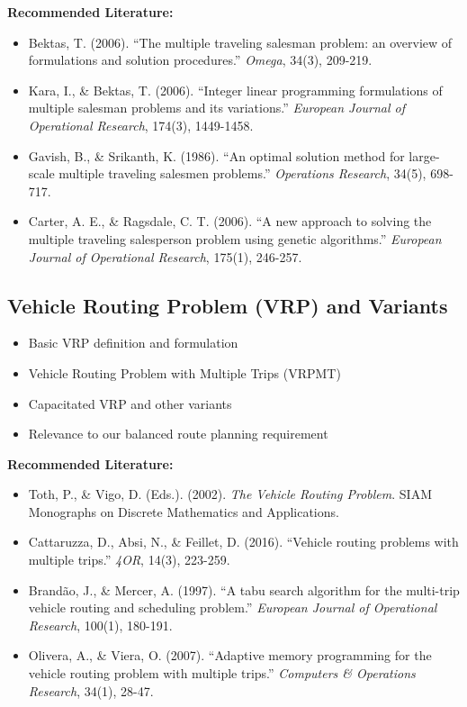 \noindent\textbf{Recommended Literature:}
\begin{itemize}
    \item Bektas, T. (2006). ``The multiple traveling salesman problem: an overview of formulations and solution procedures.'' \textit{Omega}, 34(3), 209-219.
    \item Kara, I., \& Bektas, T. (2006). ``Integer linear programming formulations of multiple salesman problems and its variations.'' \textit{European Journal of Operational Research}, 174(3), 1449-1458.
    \item Gavish, B., \& Srikanth, K. (1986). ``An optimal solution method for large-scale multiple traveling salesmen problems.'' \textit{Operations Research}, 34(5), 698-717.
    \item Carter, A. E., \& Ragsdale, C. T. (2006). ``A new approach to solving the multiple traveling salesperson problem using genetic algorithms.'' \textit{European Journal of Operational Research}, 175(1), 246-257.
\end{itemize}

\subsection{Vehicle Routing Problem (VRP) and Variants}
\begin{itemize}
    \item Basic VRP definition and formulation
    \item Vehicle Routing Problem with Multiple Trips (VRPMT)
    \item Capacitated VRP and other variants
    \item Relevance to our balanced route planning requirement
\end{itemize}

\noindent\textbf{Recommended Literature:}
\begin{itemize}
    \item Toth, P., \& Vigo, D. (Eds.). (2002). \textit{The Vehicle Routing Problem}. SIAM Monographs on Discrete Mathematics and Applications.
    \item Cattaruzza, D., Absi, N., \& Feillet, D. (2016). ``Vehicle routing problems with multiple trips.'' \textit{4OR}, 14(3), 223-259.
    \item Brandão, J., \& Mercer, A. (1997). ``A tabu search algorithm for the multi-trip vehicle routing and scheduling problem.'' \textit{European Journal of Operational Research}, 100(1), 180-191.
    \item Olivera, A., \& Viera, O. (2007). ``Adaptive memory programming for the vehicle routing problem with multiple trips.'' \textit{Computers \& Operations Research}, 34(1), 28-47.
\end{itemize}

